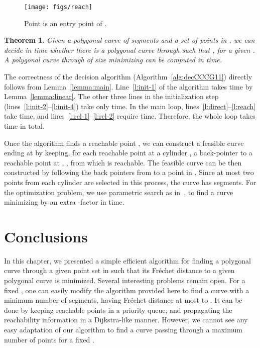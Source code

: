 \documentclass[12pt]{dalthesis}
\def\favoritefont{\bfseries \sffamily}
\def\QED{\ensuremath{{\Box}}}
\def\markatright#1{\leavevmode\unskip\nobreak\quad\hspace*{\fill}{#1}}
\newenvironment{proof}
	{\begin{trivlist}\item[\hskip\labelsep{\favoritefont Proof:}]}
	{\markatright{\QED}\end{trivlist}}
\newtheorem{theorem}{Theorem}
\newcommand{\Frechet}{Fr\'echet }
\begin{document}
\begin{figure}[t]
	\centering
	\texttt{[image: figs/reach]}
	\caption{Point  is an entry point of .}
	\label{fig:reach}
\end{figure}


\begin{theorem} \label{thm:main}
	Given a polygonal curve  of  segments and a set  of  points in , 
	we can decide in  time whether there is a polygonal curve  through  
	such that , for a given .
	A polygonal curve  through  of size  minimizing  
	can be computed in  time.
\end{theorem}

\begin{proof}
	The correctness of the decision algorithm (Algorithm~\ref{alg:decCCCG11})
	directly follows from Lemma~\ref{lemma:main}.
	Line~\ref{l:init-1} of the algorithm takes  time by Lemma~\ref{lemma:linear}.
	The other three lines in the initialization step (lines~\ref{l:init-2}--\ref{l:init-4}) take only  time.
	In the main loop, lines~\ref{l:direct}--\ref{l:reach} take  time, and
	lines~\ref{l:rel-1}--\ref{l:rel-2} require  time.
	Therefore, the whole loop takes  time in total.

	Once the algorithm finds a reachable point ,
	we can construct a feasible curve  ending at  by keeping, 
	for each reachable point  at a cylinder , 
	a back-pointer to a reachable point  at , , 
	from which  is reachable. 
	The feasible curve  can be then constructed 
	by following the back pointers from  to a point in . Since at most two points from each cylinder are selected in this process,
	the curve  has  segments.
	For the optimization problem, we use parametric search as in~\cite{AltERW03a,AltG95}, 
	to find a curve minimizing  by an extra -factor
	in  time.
\end{proof}




\section{Conclusions}

In this chapter, we presented a simple efficient algorithm 
for finding a polygonal curve through a given point set  in 
such that its \Frechet distance to a given polygonal curve  is minimized.
Several interesting problems remain open.
For a fixed , one can easily modify the algorithm provided
here to find a curve with a minimum number of segments, 
having \Frechet distance at most  to .
It can be done by keeping reachable points in a priority queue,
and propagating the reachability information in a Dijkstra-like manner.
However, we cannot see any easy adaptation of our algorithm to 
find a curve passing through a maximum number of points for a fixed .
\end{document}
